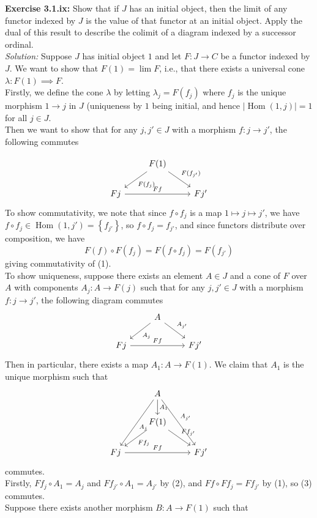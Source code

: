 \documentclass[a4paper]{article}
\DeclareMathOperator{\Hom}{Hom}
\begin{document}
\textbf{Exercise 3.1.ix:} Show that if $J$ has an initial object, then the
limit of any functor indexed by $J$ is the value of that functor at an initial
object. Apply the dual of this result to describe the colimit of a diagram
indexed by a successor ordinal.\\
\linebreak
\textit{Solution:} Suppose $J$ has initial object $1$ and
let $F  \colon J \to C$ be a functor indexed by $J$.
We want to show that $F(1) = \lim F$, i.e., that there exists
a universal cone $\lambda  \colon F(1) \implies F$.\\
Firstly, we define the cone $\lambda$ by letting
$\lambda_j = F(f_j)$ where
$f_j$ is the unique morphism $1 \to j$ in $J$ (uniqueness by $1$ being initial,
and hence $\left| \Hom(1,j) \right| = 1$ for all $j \in J$.\\
Then we want to show that
for any $j,j' \in J$ with a morphism $f  \colon j \to j'$, the following commutes

\begin{equation}
\begin{tikzcd}
     & F(1) \ar[dl, "F(f_j)"] \ar[dr, "F(f_{j'})"] &\\
    Fj \ar[rr, "Ff"] & & Fj'
\end{tikzcd}
\end{equation}
To show commutativity, we note that since
$f \circ f_j$ is a map $1 \mapsto j \mapsto j'$, we have
$f \circ f_j \in \Hom\left( 1,j' \right) = \left\{ f_{j'} \right\} $, so
$f \circ f_j = f_{j'}$, and since functors distribute over composition, we have
\[
    F(f) \circ F\left( f_j \right) 
    = F(f \circ f_j) = F(f_{j'})
\] 
giving commutativity of (1).\\
\linebreak
To show uniqueness, suppose there exists
an element $A \in J$ and a cone  of $F$ over $A$ with
components $A_j  \colon A \to F(j)$ such that
for any $j,j' \in J$ with a morphism $f  \colon j \to j'$, the following
diagram commutes
\begin{equation}
\begin{tikzcd}
    & A \ar[dl, "A_j"] \ar[dr, "A_{j'}"] & \\
    Fj \ar[rr, "Ff"] & & Fj'
\end{tikzcd}
\end{equation}
Then in particular,  there exists a map
$A_1  \colon A \to F(1)$. We claim that $A_1$ is the unique morphism such that
\begin{equation}
\begin{tikzcd}
    & A \ar[ddl, "A_j"] \ar[ddr, "A_{j'}"] \ar[d, "A_1"] &\\
    & F(1) \ar[dl, "Ff_j"] \ar[dr, "Ff_{j'}"] &\\
    Fj \ar[rr, "Ff"] & & Fj'
\end{tikzcd}
\end{equation}
commutes.\\
Firstly, $F f_{j} \circ A_1 = A_j$ and
$F f_{j'} \circ A_1 = A_{j'}$ by (2), and
$F f \circ Ff_{j} = Ff_{j'}$ by (1), so (3) commutes.\\
Suppose there exists another morphism
$B  \colon A \to F(1)$ such that
\end{document}
